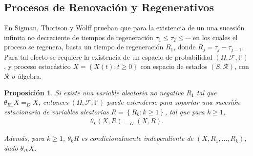 \documentclass{article}
\newtheorem{Prop}{Proposición}
\newcommand{\prob}{\mathbb{P}}
\begin{document}
\subsection{Procesos de Renovaci\'on y Regenerativos}




En Sigman, Thorison y Wolff \cite{Sigman2} prueban que para la existencia de un una sucesi\'on infinita no decreciente de tiempos de regeneraci\'on $\tau_{1}\leq\tau_{2}\leq\cdots$ en los cuales el proceso se regenera, basta un tiempo de regeneraci\'on $R_{1}$, donde $R_{j}=\tau_{j}-\tau_{j-1}$. Para tal efecto se requiere la existencia de un espacio de probabilidad $\left(\Omega,\mathcal{F},\prob\right)$, y proceso estoc\'astico $\textit{X}=\left\{X\left(t\right):t\geq0\right\}$ con espacio de estados $\left(S,\mathcal{R}\right)$, con $\mathcal{R}$ $\sigma$-\'algebra.

\begin{Prop}
Si existe una variable aleatoria no negativa $R_{1}$ tal que $\theta_{R1}X=_{D}X$, entonces $\left(\Omega,\mathcal{F},\prob\right)$ puede extenderse para soportar una sucesi\'on estacionaria de variables aleatorias $R=\left\{R_{k}:k\geq1\right\}$, tal que para $k\geq1$,
\begin{eqnarray*}
\theta_{k}\left(X,R\right)=_{D}\left(X,R\right).
\end{eqnarray*}

Adem\'as, para $k\geq1$, $\theta_{k}R$ es condicionalmente independiente de $\left(X,R_{1},\ldots,R_{k}\right)$, dado $\theta_{\tau k}X$.

\end{Prop}
\end{document}
